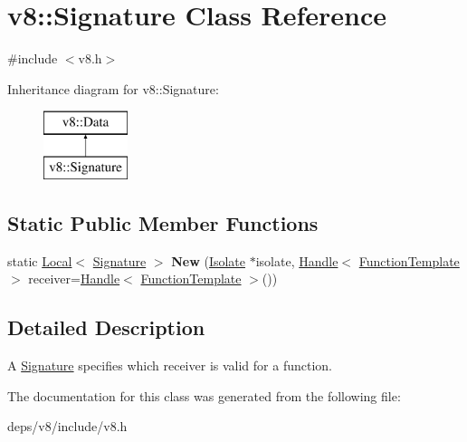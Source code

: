 \hypertarget{classv8_1_1_signature}{}\section{v8\+:\+:Signature Class Reference}
\label{classv8_1_1_signature}


{\ttfamily \#include $<$v8.\+h$>$}

Inheritance diagram for v8\+:\+:Signature\+:\begin{figure}[H]
\begin{center}
\leavevmode
\includegraphics[height=2.000000cm]{classv8_1_1_signature}
\end{center}
\end{figure}
\subsection*{Static Public Member Functions}
\begin{DoxyCompactItemize}
\item 
\hypertarget{classv8_1_1_signature_a1c3df0fef59e22a74f0828a0deae1760}{}static \hyperlink{classv8_1_1_local}{Local}$<$ \hyperlink{classv8_1_1_signature}{Signature} $>$ {\bfseries New} (\hyperlink{classv8_1_1_isolate}{Isolate} $\ast$isolate, \hyperlink{classv8_1_1_local}{Handle}$<$ \hyperlink{classv8_1_1_function_template}{Function\+Template} $>$ receiver=\hyperlink{classv8_1_1_local}{Handle}$<$ \hyperlink{classv8_1_1_function_template}{Function\+Template} $>$())\label{classv8_1_1_signature_a1c3df0fef59e22a74f0828a0deae1760}

\end{DoxyCompactItemize}


\subsection{Detailed Description}
A \hyperlink{classv8_1_1_signature}{Signature} specifies which receiver is valid for a function. 

The documentation for this class was generated from the following file\+:\begin{DoxyCompactItemize}
\item 
deps/v8/include/v8.\+h\end{DoxyCompactItemize}
